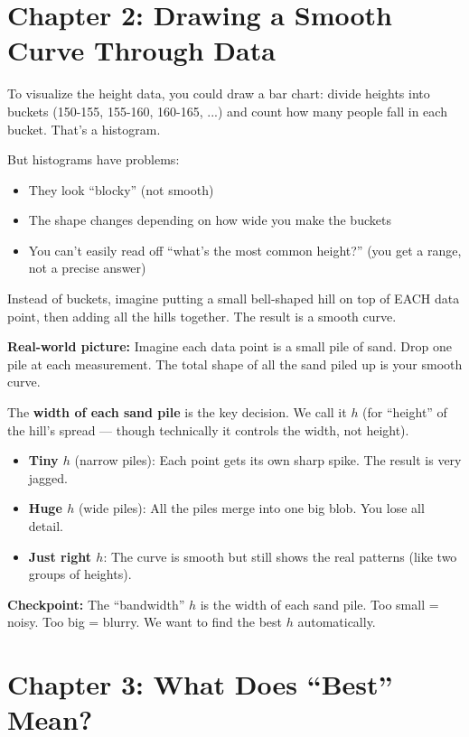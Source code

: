 \documentclass[12pt]{article}
\newcommand{\concept}[2]{\begin{tcolorbox}[colback=blue!3,colframe=blue!40!black,title={#1},breakable]#2\end{tcolorbox}}
\newcommand{\realworld}[1]{\begin{tcolorbox}[colback=green!5,colframe=green!50!black,breakable]\textbf{Real-world picture:} #1\end{tcolorbox}}
\newcommand{\checkpoint}[1]{\begin{tcolorbox}[colback=purple!5,colframe=purple!50!black,breakable]\textbf{Checkpoint:} #1\end{tcolorbox}}
\begin{document}
\section{Chapter 2: Drawing a Smooth Curve Through Data}

\concept{The histogram (what you probably already know)}{
To visualize the height data, you could draw a bar chart: divide heights into buckets (150-155, 155-160, 160-165, ...) and count how many people fall in each bucket. That's a histogram.
}

But histograms have problems:
\begin{itemize}
\item They look ``blocky'' (not smooth)
\item The shape changes depending on how wide you make the buckets
\item You can't easily read off ``what's the most common height?'' (you get a range, not a precise answer)
\end{itemize}

\concept{The smooth version: putting a bump on each point}{
Instead of buckets, imagine putting a small bell-shaped hill on top of EACH data point, then adding all the hills together. The result is a smooth curve.
}

\realworld{Imagine each data point is a small pile of sand. Drop one pile at each measurement. The total shape of all the sand piled up is your smooth curve.}

The \textbf{width of each sand pile} is the key decision. We call it $h$ (for ``height'' of the hill's spread --- though technically it controls the width, not height).

\begin{itemize}
\item \textbf{Tiny $h$} (narrow piles): Each point gets its own sharp spike. The result is very jagged.
\item \textbf{Huge $h$} (wide piles): All the piles merge into one big blob. You lose all detail.
\item \textbf{Just right $h$}: The curve is smooth but still shows the real patterns (like two groups of heights).
\end{itemize}

\checkpoint{The ``bandwidth'' $h$ is the width of each sand pile. Too small = noisy. Too big = blurry. We want to find the best $h$ automatically.}

\section{Chapter 3: What Does ``Best'' Mean?}
\end{document}
